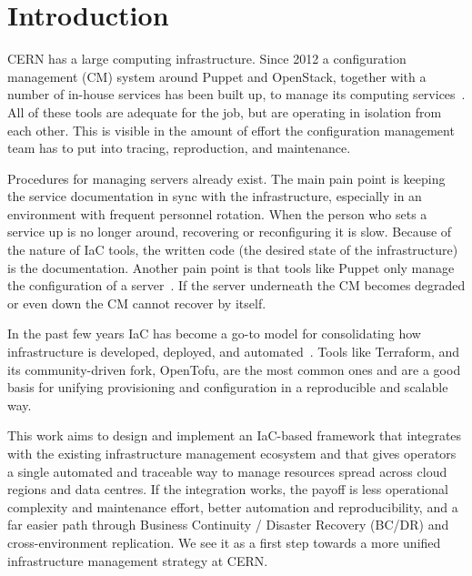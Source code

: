 \section{Introduction}
\label{intro}

CERN has a large computing infrastructure. Since 2012 a configuration management (CM) system around Puppet and OpenStack, together with a number of in-house services has been built up, to manage its computing services~\cite{bellinfra2012}.
All of these tools are adequate for the job, but are operating in isolation from each other. This is visible in the amount of effort the configuration management team has to put into tracing, reproduction, and maintenance.

Procedures for managing servers already exist. The main pain point is keeping the service documentation in sync with the infrastructure, especially in an environment with frequent personnel rotation. When the person who sets a service up is no longer around, recovering or reconfiguring it is slow. Because of the nature of IaC tools, the written code (the desired state of the infrastructure) is the documentation. Another pain point is that tools like Puppet only manage the configuration of a server~\cite{loope2011managing}. If the server underneath the CM becomes degraded or even down the CM cannot recover by itself.

In the past few years IaC has become a go-to model for consolidating how infrastructure is developed, deployed, and automated~\cite{morris2025infrastructure}. Tools like Terraform, and its community-driven fork, OpenTofu, are the most common ones and are a good basis for unifying provisioning and configuration in a reproducible and scalable way.

This work aims to design and implement an IaC-based framework that integrates with the existing infrastructure management ecosystem and that gives operators a single automated and traceable way to manage resources spread across cloud regions and data centres. 
If the integration works, the payoff is less operational complexity and maintenance effort, better automation and reproducibility, and a far easier path through Business Continuity / Disaster Recovery (BC/DR) and cross-environment replication. We see it as a first step towards a more unified infrastructure management strategy at CERN.
